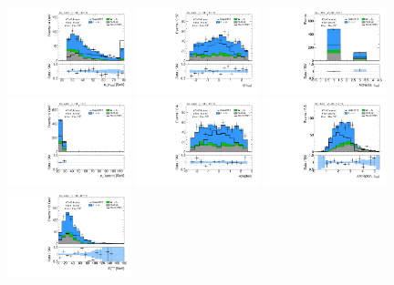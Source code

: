 \begin{figure}[tp]
  \centering
  \includegraphics[width=0.32\textwidth]{figures/vbf-LTT/tau-pt}
  \includegraphics[width=0.32\textwidth]{figures/vbf-LTT/tau-eta}
  \includegraphics[width=0.32\textwidth]{figures/vbf-LTT/tau-numTrack}
  \includegraphics[width=0.32\textwidth]{figures/vbf-LTT/lep-pt-hi}
  \includegraphics[width=0.32\textwidth]{figures/vbf-LTT/lep-eta}
  \includegraphics[width=0.32\textwidth]{figures/vbf-LTT/taulep-dR}
  \includegraphics[width=0.32\textwidth]{figures/vbf-LTT/met-pt-hi}

\end{figure}
